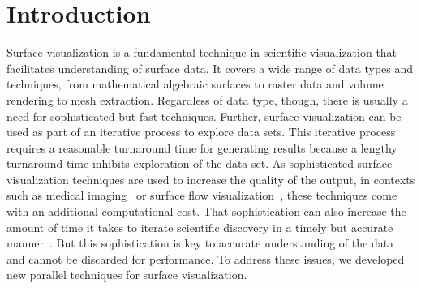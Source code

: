 \chapter{Introduction}\label{chapt:intro} 
Surface visualization is a fundamental technique in scientific visualization that facilitates understanding of surface data. It covers a wide range of data types and techniques, from mathematical algebraic surfaces to raster data and volume rendering to mesh extraction. Regardless of data type, though, there is usually a need for sophisticated but fast techniques. Further, surface visualization can be used as part of an iterative process to explore data sets. This iterative process requires a reasonable turnaround time for generating results because a lengthy turnaround time inhibits exploration of the data set.
As sophisticated surface visualization techniques are used to increase the quality of the output, in contexts such as medical imaging~\cite{PE.VMLS.VMLS2013.049-053} or surface flow visualization~\cite{SCI:Kim2015a}, these techniques come with an additional computational cost. That sophistication can also increase the amount of time it takes to iterate scientific discovery in a timely but accurate manner~\cite{Swe2012}. But this sophistication is key to accurate understanding of the data and cannot be discarded for performance. To address these issues, we developed new parallel techniques for surface visualization.

